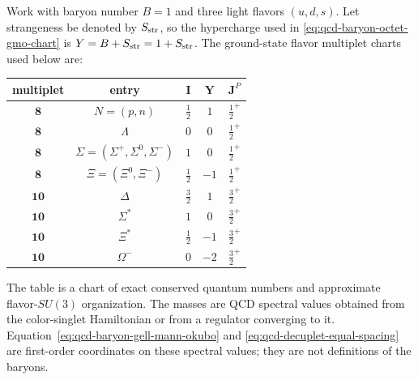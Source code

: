 \begin{definition}
\label{def:qcd-light-baryon-spectroscopy-charts}
Work with baryon number \(B=1\) and three light flavors
\((u,d,s)\).  Let strangeness be denoted by \(S_{\rm str}\), so the
hypercharge used in \eqref{eq:qcd-baryon-octet-gmo-chart} is
\(Y=B+S_{\rm str}=1+S_{\rm str}\).  The ground-state flavor multiplet charts
used below are:
\begin{center}
\small
\begin{tabular}{c|c|c|c|c}
\textbf{multiplet} & \textbf{entry} & \(\mathbf I\) & \(\mathbf Y\) & \(\mathbf J^P\)\\
\hline
\(\mathbf 8\) & \(N=(p,n)\) & \(\frac12\) & \(1\) & \(\frac12^+\)\\
\(\mathbf 8\) & \(\Lambda\) & \(0\) & \(0\) & \(\frac12^+\)\\
\(\mathbf 8\) & \(\Sigma=(\Sigma^+,\Sigma^0,\Sigma^-)\) & \(1\) & \(0\) & \(\frac12^+\)\\
\(\mathbf 8\) & \(\Xi=(\Xi^0,\Xi^-)\) & \(\frac12\) & \(-1\) & \(\frac12^+\)\\
\hline
\(\mathbf {10}\) & \(\Delta\) & \(\frac32\) & \(1\) & \(\frac32^+\)\\
\(\mathbf {10}\) & \(\Sigma^\ast\) & \(1\) & \(0\) & \(\frac32^+\)\\
\(\mathbf {10}\) & \(\Xi^\ast\) & \(\frac12\) & \(-1\) & \(\frac32^+\)\\
\(\mathbf {10}\) & \(\Omega^-\) & \(0\) & \(-2\) & \(\frac32^+\)
\end{tabular}
\end{center}
The table is a chart of exact conserved quantum numbers and approximate
flavor-\(SU(3)\) organization.  The masses are QCD spectral values obtained
from the color-singlet Hamiltonian or from a regulator converging to it.
Equation~\eqref{eq:qcd-baryon-gell-mann-okubo} and
\eqref{eq:qcd-decuplet-equal-spacing} are first-order coordinates on these
spectral values; they are not definitions of the baryons.
\end{definition}

